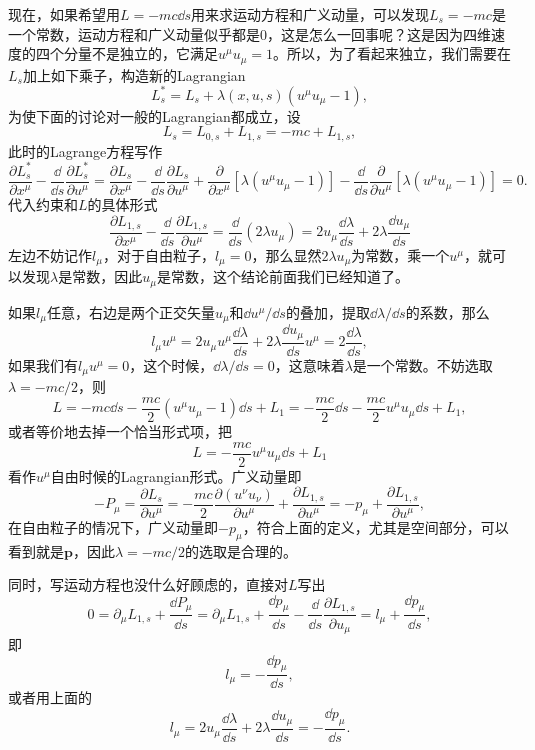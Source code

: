 \documentclass[9pt]{extbook}
\begin{document}
现在，如果希望用$L=-mc \dd s$用来求运动方程和广义动量，可以发现$L_s=-mc$是一个常数，运动方程和广义动量似乎都是0，这是怎么一回事呢？这是因为四维速度的四个分量不是独立的，它满足$u^\mu u_\mu=1$。所以，为了看起来独立，我们需要在$L_s$加上如下乘子，构造新的Lagrangian
\[
	L^*_s=L_s+\lambda(x,u,s) (u^\mu u_\mu-1),
\]
为使下面的讨论对一般的Lagrangian都成立，设
\[
L_s=L_{0,s}+L_{1,s}=-mc+L_{1,s},
\]
此时的Lagrange方程写作
\begin{equation}
	\frac{\partial L^*_s}{\partial x^\mu}-\frac{\dd}{\dd s}\frac{\partial L^*_s}{\partial u^\mu}=\frac{\partial L_s}{\partial x^\mu}-\frac{\dd}{\dd s}\frac{\partial L_s}{\partial u^\mu}+\frac{\partial}{\partial x^\mu}[\lambda (u^\mu u_\mu-1)]-\frac{\dd}{\dd s}\frac{\partial}{\partial u^\mu}[\lambda(u^\mu u_\mu-1)]=0.
\label{lagra}
\end{equation}
代入约束和$L$的具体形式
\[
	\frac{\partial L_{1,s}}{\partial x^\mu}-\frac{\dd}{\dd s}\frac{\partial L_{1,s}}{\partial u^\mu}=\frac{\dd}{\dd s}\left(2\lambda u_\mu\right)=2u_\mu\frac{\dd \lambda }{\dd s}+2\lambda \frac{\dd u_\mu}{\dd s}
\]
左边不妨记作$l_\mu$，对于自由粒子，$l_\mu=0$，那么显然$2\lambda u_\mu$为常数，乘一个$u^\mu$，就可以发现$\lambda$是常数，因此$u_\mu$是常数，这个结论前面我们已经知道了。

如果$l_\mu$任意，右边是两个正交矢量$u_\mu$和$\dd u^\mu/\dd s$的叠加，提取$\dd \lambda/\dd s$的系数，那么
\[
	l_\mu u^\mu =2u_\mu u^\mu\frac{\dd \lambda }{\dd s}+2\lambda \frac{\dd u_\mu}{\dd s}u^\mu=2\frac{\dd \lambda }{\dd s},
\]
如果我们有$l_\mu u^\mu=0$，这个时候，$\dd \lambda /\dd s=0$，这意味着$\lambda$是一个常数。不妨选取$\lambda = -mc/2$，则
\[
	L=-mc\dd s-\frac{mc}{2}(u^\mu u_\mu-1)\dd s+L_1=-\frac{mc}{2}\dd s-\frac{mc}{2}u^\mu u_\mu\dd s+L_1,
\]
或者等价地去掉一个恰当形式项，把
\begin{equation}
	L=-\frac{mc}{2}u^\mu u_\mu\dd s+L_1
	\label{freeparticle}
\end{equation}
看作$u^\mu$自由时候的Lagrangian形式。广义动量即
\[
	-P_\mu=\frac{\partial L_s}{\partial u^\mu}=-\frac{mc}{2}\frac{\partial (u^\nu u_\nu)}{\partial u^\mu}+\frac{\partial L_{1,s}}{\partial u^\mu}=-p_\mu+\frac{\partial L_{1,s}}{\partial u^\mu},
\]
在自由粒子的情况下，广义动量即$-p_\mu$，符合上面的定义，尤其是空间部分，可以看到就是$\bm{p}$，因此$\lambda = -mc/2$的选取是合理的。

同时，写运动方程也没什么好顾虑的，直接对$L$写出
\[
	0=\partial_{\mu} L_{1,s}+\frac{\dd P_\mu}{\dd s}=\partial_{\mu} L_{1,s}+\frac{\dd p_\mu}{\dd s}-\frac{\dd }{\dd s}\frac{\partial L_{1,s}}{\partial u_\mu}=l_\mu+\frac{\dd p_\mu}{\dd s},
\]
即
\begin{equation}
	l_\mu=-\frac{\dd p_\mu}{\dd s},
	\label{leq1}
\end{equation}
或者用上面的
\[
	l_\mu=2u_\mu\frac{\dd \lambda }{\dd s}+2\lambda \frac{\dd u_\mu}{\dd s}=-\frac{\dd p_\mu}{\dd s}.
\]
\end{document}
